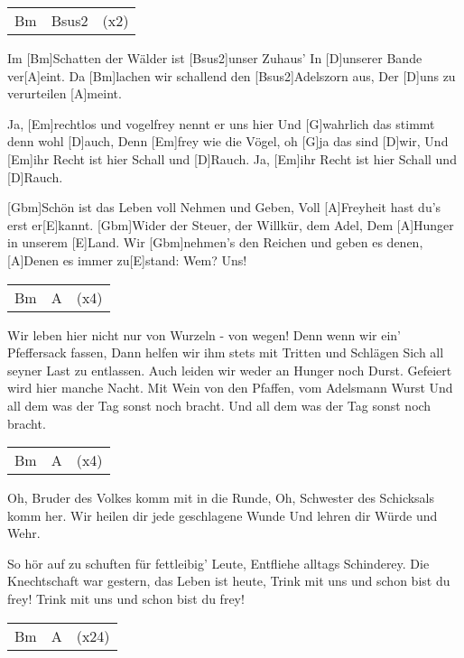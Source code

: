 

\begin{guitar}
	{\footnotesize\begin{tabular}{l|ll}
			Bm & Bsus2 & (x2)
	\end{tabular}}
	
	Im [Bm]Schatten der Wälder ist [Bsus2]unser Zuhaus'
	In [D]unserer Bande ver[A]eint.
	Da [Bm]lachen wir schallend den [Bsus2]Adelszorn aus,
	Der [D]uns zu verurteilen [A]meint.
	
	Ja, [Em]rechtlos und vogelfrey nennt er uns hier
	Und [G]wahrlich das stimmt denn wohl [D]auch,
	Denn [Em]frey wie die Vögel, oh [G]ja das sind [D]wir,
	Und [Em]ihr Recht ist hier Schall und [D]Rauch.
	Ja, [Em]ihr Recht ist hier Schall und [D]Rauch.
	
	[Gbm]Schön ist das Leben voll Nehmen und Geben,
	Voll [A]Freyheit hast du's erst er[E]kannt.
	[Gbm]Wider der Steuer, der Willkür, dem Adel,
	Dem [A]Hunger in unserem [E]Land.
	Wir [Gbm]nehmen's den Reichen und geben es denen,
	[A]Denen es immer zu[E]stand:
	Wem? Uns!
	
	{\footnotesize\begin{tabular}{l|ll}
			Bm & A & (x4)
	\end{tabular}}
	
	Wir leben hier nicht nur von Wurzeln - von wegen!
	Denn wenn wir ein' Pfeffersack fassen,
	Dann helfen wir ihm stets mit Tritten und Schlägen
	Sich all seyner Last zu entlassen.
	\pagebreak
	Auch leiden wir weder an Hunger noch Durst.
	Gefeiert wird hier manche Nacht.
	Mit Wein von den Pfaffen, vom Adelsmann Wurst
	Und all dem was der Tag sonst noch bracht.
	Und all dem was der Tag sonst noch bracht.
	
	 
	
	{\footnotesize\begin{tabular}{l|ll}
			Bm & A & (x4)
	\end{tabular}}
	
	Oh, Bruder des Volkes komm mit in die Runde,
	Oh, Schwester des Schicksals komm her.
	Wir heilen dir jede geschlagene Wunde
	Und lehren dir Würde und Wehr.
	
	So hör auf zu schuften für fettleibig' Leute,
	Entfliehe alltags Schinderey.
	Die Knechtschaft war gestern, das Leben ist heute,
	Trink mit uns und schon bist du frey!
	Trink mit uns und schon bist du frey!
	
	 
	
	{\footnotesize\begin{tabular}{l|ll}
			Bm & A & (x24)
	\end{tabular}}
\end{guitar}